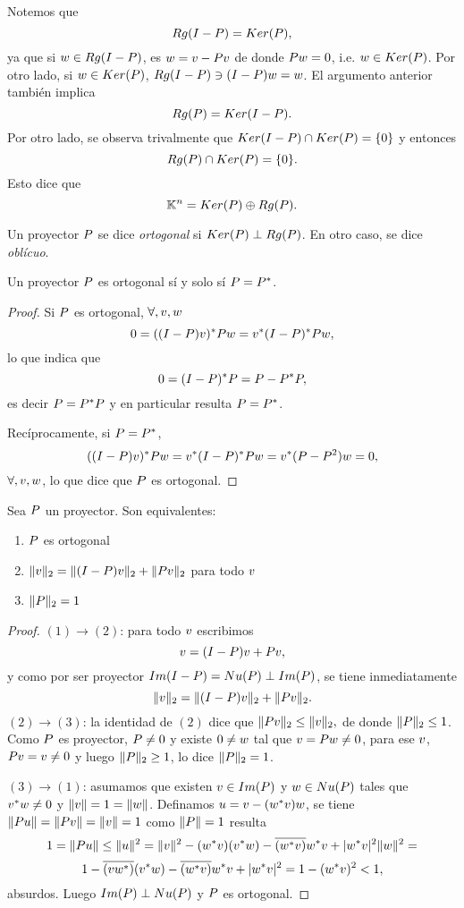 Notemos que
$$Rg(\Ib-\Pb)=Ker(\Pb),$$
ya que si $\wb\in Rg(\Ib-\Pb)$, es $\wb=\vb-\Pb\vb$ de donde $\Pb\wb=\cero$, i.e. $\wb\in Ker(\Pb)$. Por otro lado, si $\wb\in Ker(\Pb)$,
$Rg(\Ib-\Pb)\ni (\Ib-\Pb)\wb=\wb$. El argumento anterior también implica
$$Rg(\Pb)=Ker(\Ib-\Pb).$$
Por otro lado, se observa trivalmente que  $Ker(\Ib-\Pb)\cap Ker(\Pb)=\{\cero\}$ y entonces
$$Rg(\Pb)\cap Ker(\Pb)=\{\cero\}.$$
Esto dice que
$$
\Kn=Ker(\Pb)\oplus Rg(\Pb).
$$
\tccdefi
\begin{defi}
 Un proyector $\Pb$ se dice \emph{ortogonal} si $Ker(\Pb)\perp Rg(\Pb)$. En otro caso, se dice \emph{oblícuo}.
\end{defi}
\etcc
\tcc
\begin{prop}
\label{prop:ortssiautoadjunto}
Un proyector $\Pb$ es ortogonal sí y solo sí $\Pb=\Pb^*$.
\end{prop}
\etcc
\begin{proof}
 Si $\Pb$ es ortogonal, $\forall, \vb,\wb$
 $$
 0=((\Ib-\Pb)\vb)^*\Pb\wb=\vb^*(\Ib-\Pb)^*\Pb\wb,
 $$
 lo que indica que
 $$
 \cero=(\Ib-\Pb)^*\Pb=\Pb-\Pb^*\Pb,
 $$
 es decir $\Pb=\Pb^*\Pb$ y en particular resulta $\Pb=\Pb^*$.

 Recíprocamente, si $\Pb=\Pb^*$,
 $$
 ((\Ib-\Pb)\vb)^*\Pb\wb=\vb^*(\Ib-\Pb)^*\Pb\wb=\vb^*(\Pb-\Pb^2)\wb=0,
 $$
 $\forall, \vb,\wb$, lo que dice que $\Pb$ es ortogonal.
\end{proof}

\tcc
\begin{teo}
 Sea $\Pb$ un proyector. Son equivalentes:
 \begin{enumerate}
  \item $\Pb$ es ortogonal
  \item $\|\vb\|_2=\|(\Ib-\Pb)\vb\|_2+\|\Pb\vb\|_2$ para todo $\vb$
  \item $\|\Pb\|_2=1$
 \end{enumerate}
\end{teo}
\etcc
\begin{proof}
 $(1)\rightarrow (2)$: para todo $\vb$ escribimos
 $$
 \vb=(\Ib-\Pb)\vb+\Pb\vb,
 $$
 y como por ser proyector $Im(\Ib-\Pb)=Nu(\Pb)\perp Im(\Pb)$, se tiene inmediatamente
 $$\|\vb\|_2=\|(\Ib-\Pb)\vb\|_2+\|\Pb\vb\|_2.$$
$(2)\rightarrow (3)$:
la identidad de $(2)$ dice que
$\|\Pb \vb\|_2\le \| \vb\|_2,$ de donde
$\|\Pb\|_2\le 1$. Como $\Pb$ es proyector,
$\Pb\neq \cero$ y existe $\cero\neq\wb$ tal que $\vb=\Pb\wb\neq\cero$, para ese $\vb$, $\Pb\vb=\vb\neq\cero$ y luego $\|\Pb\|_2\ge 1$, lo dice $\|\Pb\|_2= 1$.

\noindent $(3)\rightarrow (1)$: asumamos que existen $\vb\in Im(\Pb)$ y
$\wb\in Nu(\Pb)$ tales que $\vb^*\wb\neq 0$ y $\|\vb\|=1=\|\wb\|$. Definamos $\ub=\vb-(\wb^*\vb)\wb$, se tiene $\|\Pb\ub\|=\|\Pb\vb\|=\|\vb\|=1$ como $\|\Pb\|=1$ resulta
$$1=\|\Pb\ub\|\le \|\ub\|^2=\|\vb\|^2-
(\wb^*\vb)(\vb^*\wb)-\overline{(\wb^*\vb)}\wb^*\vb+|\wb^*\vb|^2\|\wb\|^2=
$$
$$
1-\overline{(\vb\wb^*)}(\vb^*\wb)-\overline{(\wb^*\vb)}\wb^*\vb+|\wb^*\vb|^2
=1-(\wb^*\vb)^2<1,
$$
absurdos. Luego $Im(\Pb)\perp Nu(\Pb)$ y $\Pb$ es ortogonal.
 \end{proof}

